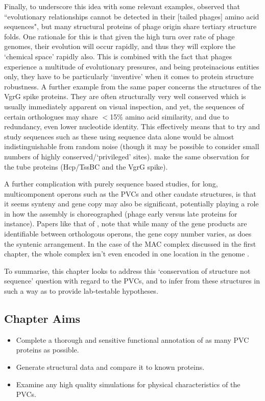 Finally, to underscore this idea with some relevant examples, \cite{Leiman2010} observed that ``evolutionary relationships cannot be detected in their [tailed phages] amino acid sequences", but many structural proteins of phage origin share tertiary structure folds. One rationale for this is that given the high turn over rate of phage genomes, their evolution will occur rapidly, and thus they will explore the `chemical space' rapidly also. This is combined with the fact that phages experience a multitude of evolutionary pressures, and being proteinacious entities only, they have to be particularly `inventive' when it comes to protein structure robustness. A further example from the same paper concerns the structures of the VgrG spike proteins. They are often structurally very well conserved which is usually immediately apparent on visual inspection, and yet, the sequences of certain orthologues may share $<$15\% amino acid similarity, and due to redundancy, even lower nucleotide identity. This effectively means that to try and study sequences such as these using sequence data alone would be almost indistinguishable from random noise (though it may be possible to consider small numbers of highly conserved/`privileged' sites). \cite{Silverman2012} make the same observation for the tube proteins (Hcp/TssBC and the VgrG spike).

A further complication with purely sequence based studies, for long, multicomponent operons such as the PVCs and other caudate structures, is that it seems synteny and gene copy may also be significant, potentially playing a role in how the assembly is choreographed (phage early versus late proteins for instance). Papers like that of \cite{Sarris2014}, note that while many of the gene products are identifiable between orthologous operons, the gene copy number varies, as does the syntenic arrangement. In the case of the MAC complex discussed in the first chapter, the whole complex isn't even encoded in one location in the genome \citep{Shikuma2014}. 


To summarise, this chapter looks to address this `conservation of structure not sequence' question with regard to the PVCs, and to infer from these structures in such a way as to provide lab-testable hypotheses.

\subsection*{Chapter Aims}

\begin{itemize}
	\item Complete a thorough and sensitive functional annotation of as many PVC proteins as possible.
	\item Generate structural data and compare it to known proteins.
	\item Examine any high quality simulations for physical characteristics of the PVCs.

\end{itemize}

